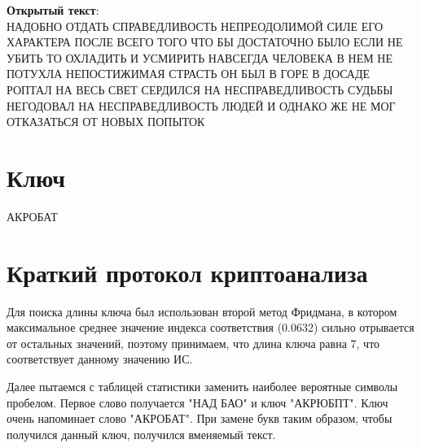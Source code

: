\documentclass[12pt, a4paper] {ncc}
\begin{document}
\textbf{Открытый текст}: \\
НАДОБНО ОТДАТЬ СПРАВЕДЛИВОСТЬ НЕПРЕОДОЛИМОЙ СИЛЕ ЕГО ХАРАКТЕРА ПОСЛЕ ВСЕГО ТОГО ЧТО БЫ ДОСТАТОЧНО БЫЛО ЕСЛИ НЕ УБИТЬ ТО ОХЛАДИТЬ И УСМИРИТЬ НАВСЕГДА ЧЕЛОВЕКА В НЕМ НЕ ПОТУХЛА НЕПОСТИЖИМАЯ СТРАСТЬ ОН БЫЛ В ГОРЕ В ДОСАДЕ РОПТАЛ НА ВЕСЬ СВЕТ СЕРДИЛСЯ НА НЕСПРАВЕДЛИВОСТЬ СУДЬБЫ НЕГОДОВАЛ НА НЕСПРАВЕДЛИВОСТЬ ЛЮДЕЙ И ОДНАКО ЖЕ НЕ МОГ ОТКАЗАТЬСЯ ОТ НОВЫХ ПОПЫТОК

\section{Ключ}
АКРОБАТ

\section{Краткий протокол криптоанализа}
	Для поиска длины ключа был использован второй метод Фридмана, в котором максимальное среднее значение индекса соответствия
	(0.0632) сильно отрывается от остальных значений, поэтому принимаем, что длина ключа равна 7, что соответствует данному значению ИС.

	Далее пытаемся с таблицей статистики заменить наиболее вероятные символы пробелом. Первое слово получается "НАД БАО" и ключ "АКРЮБПТ".
	Ключ очень напоминает слово "АКРОБАТ". При замене букв таким образом, чтобы получился данный ключ, получился вменяемый текст.
\end{document}
